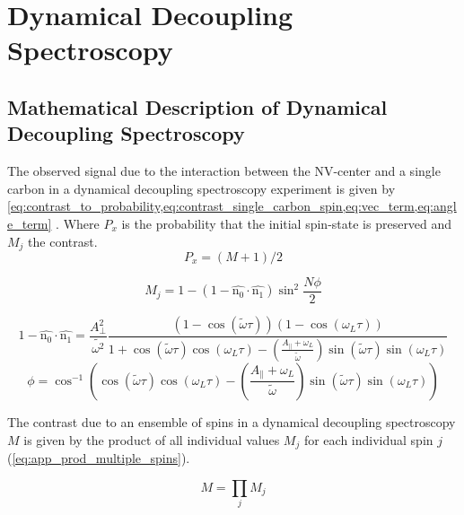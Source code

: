 \chapter{Dynamical Decoupling Spectroscopy}

\section{Mathematical Description of Dynamical Decoupling Spectroscopy}
\label{sec:mathematical_description_dd_spectro}


The observed signal due to the interaction between the NV-center and a single carbon in a dynamical decoupling spectroscopy experiment is given by \cref{eq:contrast_to_probability,eq:contrast_single_carbon_spin,eq:vec_term,eq:angle_term} \citep{Taminiau2012Detection}. Where $P_x$ is the probability that the initial spin-state is preserved and $M_j$ the contrast.
\begin{equation}
\label{eq:contrast_to_probability}
P_x = (M+1)/2
\end{equation}

\begin{equation}
\label{eq:contrast_single_carbon_spin}
M_j = 1-(1 - \hat{\bm{\mathrm{n_0}}} \cdot \hat{\bm{\mathrm{n_1}}}) \sin^2 \frac{N\phi}{2}
\end{equation}

\begin{equation}
\label{eq:vec_term}
    1 - \hat{\bm{\mathrm{n_0}}} \cdot \hat{\bm{\mathrm{n_1}}} =  \frac{A_\perp ^2}{\tilde{\omega^2}} \frac{(1- \cos{(\tilde{\omega} \tau)})(1-\cos{(\omega_L \tau)})} {1 +\cos{(\tilde{\omega} \tau)}\cos{(\omega_L \tau)} - (\frac{ A_ \parallel + \omega_L }{ \tilde{ \omega}}) \sin{(\tilde{\omega} \tau)}\sin{(\omega_L \tau)}}
\end{equation}
\begin{equation}
\label{eq:angle_term}
    \phi =  \cos^{-1}\left(\cos(\tilde{\omega} \tau) \cos(\omega_L \tau)-\left(\frac{ A_ \parallel + \omega_L }{ \tilde{ \omega}}\right) \sin(\tilde{\omega} \tau)\sin(\omega_L \tau)\right)
\end{equation}

The contrast due to an ensemble of spins in a dynamical decoupling spectroscopy$M$ is given by the product of all individual values $M_j$ for each individual spin $j$ (\cref{eq:app_prod_multiple_spins}).

\begin{equation}
    M = \prod_{j}{M_j}
    \label{eq:app_prod_multiple_spins}
\end{equation}


